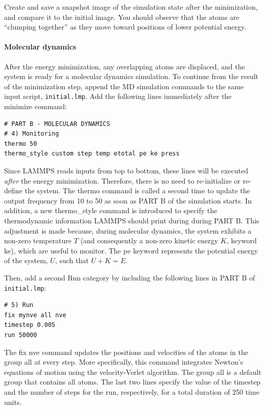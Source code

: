 \documentclass[9pt,tutorial]{livecoms}
\newcommand{\lmpcmd}[1]{\colorbox{listing}{\textcolor{command}{\small{#1}}}} %
\newcommand{\flecmd}[1]{\textcolor{command}{\texttt{#1}}} %
\begin{document}
Create and save a snapshot image of the simulation state after the
minimization, and compare it to the initial image.  You should observe
that the atoms are ``clumping together'' as they move toward positions
of lower potential energy.

\paragraph{Molecular dynamics}

After the energy minimization, any overlapping atoms are displaced, and
the system is ready for a molecular dynamics simulation.  To continue
from the result of the minimization step, append the MD simulation
commands to the same input script, \flecmd{initial.lmp}.  Add the
following lines immediately after the \lmpcmd{minimize} command:
\begin{lstlisting}
# PART B - MOLECULAR DYNAMICS
# 4) Monitoring
thermo 50
thermo_style custom step temp etotal pe ke press
\end{lstlisting}

Since LAMMPS reads inputs from top to bottom, these lines will be
executed \emph{after} the energy minimization.  Therefore, there is no
need to re-initialize or re-define the system.  The \lmpcmd{thermo}
command is called a second time to update the output frequency from 10
to 50 as soon as \lmpcmd{PART B} of the simulation starts.  In addition,
a new \lmpcmd{thermo\_style} command is introduced to specify the
thermodynamic information LAMMPS should print during during \lmpcmd{PART
  B}.  This adjustment is made because, during molecular dynamics, the
system exhibits a non-zero temperature $T$ (and consequently a non-zero
kinetic energy $K$, keyword \lmpcmd{ke}), which are useful to monitor.
The \lmpcmd{pe} keyword represents the potential energy of the system,
$U$, such that $U + K = E$.

Then, add a second \lmpcmd{Run} category by including the following
lines in \lmpcmd{PART B} of \flecmd{initial.lmp}:
\begin{lstlisting}
# 5) Run
fix mynve all nve
timestep 0.005
run 50000
\end{lstlisting}
The \lmpcmd{fix nve} command updates the positions and velocities of the
atoms in the group \lmpcmd{all} at every step.  More
  specifically, this command integrates Newton's equations of motion
  using the velocity-Verlet algorithm.  The group \lmpcmd{all} is a
default group that contains all atoms.  The last two lines specify the
value of the \lmpcmd{timestep} and the number of steps for the
\lmpcmd{run}, respectively, for a total duration of 250 time units.
\end{document}
